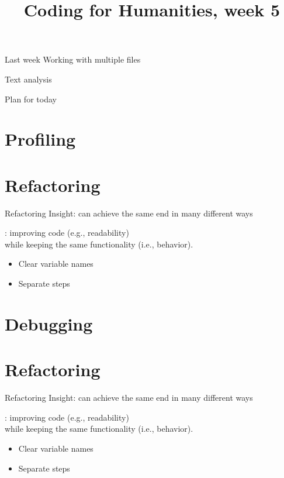 \documentclass[aspectratio=169,usenames,dvipsnames]{beamer}
\title{Coding for Humanities, week 5}
\begin{document}
\begin{frame}
 \titlepage
\end{frame}

\begin{frame}{Last week}
    Working with multiple files

    Text analysis
\end{frame}

\begin{frame}{Plan for today}
 \tableofcontents
\end{frame}


\section{Profiling}
\frame{\tableofcontents[currentsection]}
\section{Refactoring}
\frame{\tableofcontents[currentsection]}

\begin{frame}{Refactoring}
	Insight: can achieve the same end in many different ways

	\pause
	\begin{definition}
		: improving code (e.g., readability) \\
			while keeping the same functionality (i.e., behavior).
	\end{definition}

	\begin{itemize}
		\item Clear variable names
		\item Separate steps
	\end{itemize}
\end{frame}

\section{Debugging}
\frame{\tableofcontents[currentsection]}

\section{Refactoring}
\begin{frame}{Refactoring}
	Insight: can achieve the same end in many different ways

	\pause
	\begin{definition}
		: improving code (e.g., readability) \\
			while keeping the same functionality (i.e., behavior).
	\end{definition}

	\begin{itemize}
		\item Clear variable names
		\item Separate steps
	\end{itemize}
\end{frame}
\end{document}
